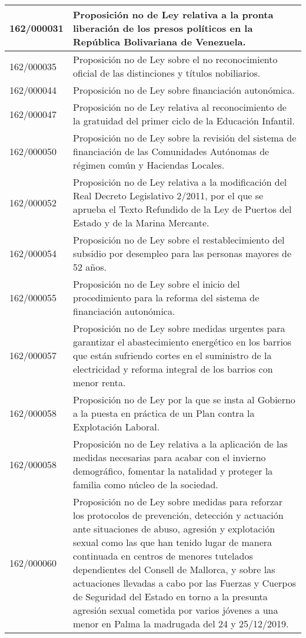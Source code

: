 {\begin{table}[H]
\begin{center}
\begin{tabularx}{\linewidth}{| l | X |}
\hline
162/000031 & Proposición no de Ley relativa a la pronta liberación de los presos políticos en la República Bolivariana de Venezuela. \\
\hline
162/000035 & Proposición no de Ley sobre el no reconocimiento oficial de las distinciones y títulos nobiliarios. \\
\hline
162/000044 & Proposición no de Ley sobre financiación autonómica. \\
\hline
162/000047 & Proposición no de Ley relativa al reconocimiento de la gratuidad del primer ciclo de la Educación Infantil. \\
\hline
162/000050 & Proposición no de Ley sobre la revisión del sistema de financiación de las Comunidades Autónomas de régimen común y Haciendas Locales. \\
\hline
162/000052 & Proposición no de Ley relativa a la modificación del Real Decreto Legislativo 2/2011, por el que se aprueba el Texto Refundido de la Ley de Puertos del Estado y de la Marina Mercante. \\
\hline
162/000054 & Proposición no de Ley sobre el restablecimiento del subsidio por desempleo para las personas mayores de 52 años. \\
\hline
162/000055 & Proposición no de Ley sobre el inicio del procedimiento para la reforma del sistema de financiación autonómica. \\
\hline
162/000057 & Proposición no de Ley sobre medidas urgentes para garantizar el abastecimiento energético en los barrios que están sufriendo cortes en el suministro de la electricidad y reforma integral de los barrios con menor renta. \\
\hline
162/000058 & Proposición no de Ley por la que se insta al Gobierno a la puesta en práctica de un Plan contra la Explotación Laboral. \\
\hline
162/000058 & Proposición no de Ley relativa a la aplicación de las medidas necesarias para acabar con el invierno demográfico, fomentar la natalidad y proteger la familia como núcleo de la sociedad. \\
\hline
162/000060 & Proposición no de Ley sobre medidas para reforzar los protocolos de prevención, detección y actuación ante situaciones de abuso, agresión y explotación sexual como las que han tenido lugar de manera continuada en centros de menores tutelados dependientes del Consell de Mallorca, y sobre las actuaciones llevadas a cabo por las Fuerzas y Cuerpos de Seguridad del Estado en torno a la presunta agresión sexual cometida por varios jóvenes a una menor en Palma la madrugada del 24 y 25/12/2019. \\

\end{tabularx}
\end{center}
\end{table}}
